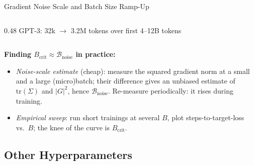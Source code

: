 \begin{frame}{Gradient Noise Scale and Batch Size Ramp-Up}
\begin{columns}[T]
\begin{column}{0.48\textwidth}
      \medskip
      {\small GPT-3: 32k $\to$ 3.2M tokens over first 4--12B tokens~\cite{brown2020gpt3}}
    \end{column}
  \end{columns}

  \vspace{0.2em}
  {\small
  \textbf{Finding $B_{\text{crit}} \approx \mathcal{B}_{\text{noise}}$ in practice:}
  \begin{itemize}
    \item \emph{Noise-scale estimate} (cheap): measure the squared gradient norm at a small and a large (micro)batch; their difference gives an unbiased estimate of $\text{tr}(\Sigma)$ and $|G|^2$, hence $\mathcal{B}_{\text{noise}}$. Re-measure periodically: it rises during training.
    \item \emph{Empirical sweep}: run short trainings at several $B$, plot steps-to-target-loss vs.\ $B$; the knee of the curve is $B_{\text{crit}}$.
  \end{itemize}}
\end{frame}

\subsection{Other Hyperparameters}

